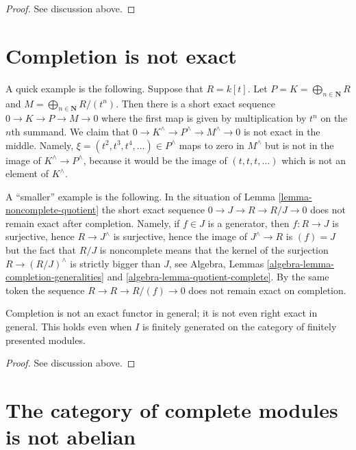 \begin{proof}
See discussion above.
\end{proof}



\section{Completion is not exact}
\label{section-completion-not-exact}

\noindent
A quick example is the following. Suppose that $R = k[t]$. Let
$P = K = \bigoplus_{n \in \mathbf{N}} R$ and
$M = \bigoplus_{n \in \mathbf{N}} R/(t^n)$. Then there is a short exact
sequence $0 \to K \to P \to M \to 0$ where the first map is given by
multiplication by $t^n$ on the $n$th summand. We claim that
$0 \to K^\wedge \to P^\wedge \to M^\wedge \to 0$ is not exact in the middle.
Namely, $\xi = (t^2, t^3, t^4, \ldots) \in P^\wedge$ maps to zero in
$M^\wedge$ but is not in the image of $K^\wedge \to P^\wedge$, because
it would be the image of $(t, t, t, \ldots)$ which is not an element of
$K^\wedge$.

\medskip\noindent
A ``smaller'' example is the following. In the situation of
Lemma \ref{lemma-noncomplete-quotient}
the short exact sequence $0 \to J \to R \to R/J \to 0$ does not remain
exact after completion. Namely, if $f \in J$ is a generator, then
$f : R \to J$ is surjective, hence $R \to J^\wedge$ is surjective, hence
the image of $J^\wedge \to R$ is $(f) = J$ but the fact that
$R/J$ is noncomplete means that the kernel of the surjection
$R \to (R/J)^\wedge$ is strictly bigger than $J$, see
Algebra, Lemmas \ref{algebra-lemma-completion-generalities} and
\ref{algebra-lemma-quotient-complete}.
By the same token the sequence
$R \to R \to R/(f) \to 0$ does not remain exact on completion.

\begin{lemma}
\label{lemma-completion-not-exact}
Completion is not an exact functor in general; it is not even
right exact in general. This holds even when $I$ is finitely
generated on the category of finitely presented modules.
\end{lemma}

\begin{proof}
See discussion above.
\end{proof}



\section{The category of complete modules is not abelian}
\label{section-non-abelian}


